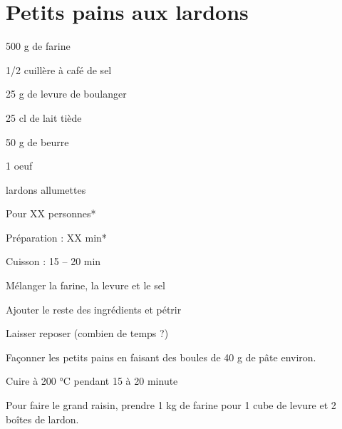\section{Petits pains aux lardons}

\begin{ingredients}
\item 500 g de farine
\item 1/2 cuillère à café de sel
\item 25 g de levure de boulanger
\item 25 cl de lait tiède
\item 50 g de beurre
\item 1 oeuf
\item lardons allumettes
\end{ingredients}
\begin{infos}
\item Pour XX personnes*		%
\item Préparation : XX min*		%
\item Cuisson : 15 -- 20 min			%
\end{infos}
\begin{etapes}
\item Mélanger la farine, la levure et le sel  
\item Ajouter le reste des ingrédients et pétrir
\item Laisser reposer (combien de temps ?)
\item Façonner les petits pains en faisant des boules de 40 g de pâte environ.
\item Cuire à 200 °C pendant 15 à 20 minute
\end{etapes}
\begin{conseils}
Pour faire le grand raisin, prendre 1 kg de farine pour 1 cube de levure et 2 boîtes de lardon.
\end{conseils}
